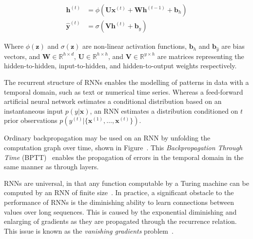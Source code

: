 \begin{align}
  \bm{h}^{(t)} &= \phi \left( \bm{U} \bm{x}^{(t)} + \bm{W} \bm{h}^{(t-1)} + \bm{b}_h \right) \\
  \bm{\hat{y}}^{(t)} &= \sigma \left( \bm{V} \bm{h}^{(t)} + \bm{b}_{\hat{y}} \right)
\end{align}

Where $\phi(\bm{z})$ and $\sigma(\bm{z})$ are non-linear activation functions, $\bm{b}_h$ and $\bm{b}_{\hat{y}}$ are bias vectors, and $\bm{W} \in \mathbb{R}^{h \times d}$, $\bm{U} \in \mathbb{R}^{h \times h}$, and $\bm{V} \in \mathbb{R}^{y \times h}$ are matrices representing the hidden-to-hidden, input-to-hidden, and hidden-to-output weights respectively.

The recurrent structure of RNNs enables the modelling of patterns in data with a temporal domain, such as text or numerical time series. Whereas a feed-forward artificial neural network estimates a conditional distribution based on an instantaneous input $p(y | \bm{x})$, an RNN estimates a distribution conditioned on $t$ prior observations $p\left(y^{(t)} | \{ \bm{x}^{(1)}, \ldots, \bm{x}^{(t)} \} \right)$.

Ordinary backpropagation may be used on an RNN by unfolding the computation graph over time, shown in Figure~. This \emph{Backpropagation Through Time} (BPTT)~\cite{Werbos1990a} enables the propagation of errors in the temporal domain in the same manner as through layers.

RNNs are universal, in that any function computable by a Turing machine can be computed by an RNN of finite size~\cite{Sontag1991}. In practice, a significant obstacle to the performance of RNNs is the diminishing ability to learn connections between values over long sequences. This is caused by the exponential diminishing and enlarging of gradients as they are propagated through the recurrence relation. This issue is known as the
\emph{vanishing gradients} problem~\cite{Bengio1994}.


